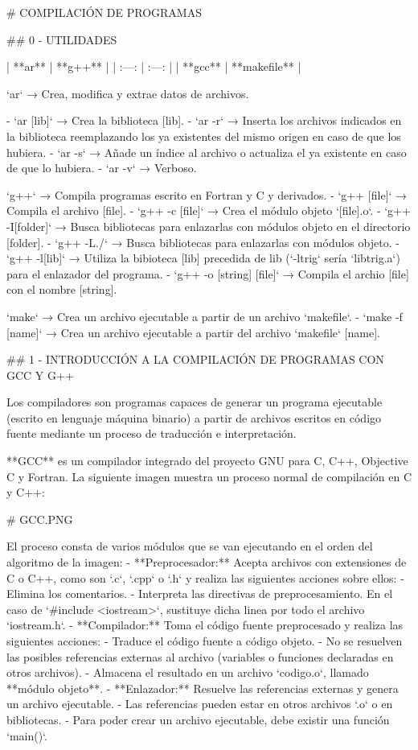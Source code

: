 # COMPILACIÓN DE PROGRAMAS

## 0 - UTILIDADES

| **ar** | **g++** |
| :---: | :---: |
| **gcc** | **makefile** |

`ar` → Crea, modifica y extrae datos de archivos.

- `ar [lib]` → Crea la biblioteca [lib].
- `ar -r` → Inserta los archivos indicados en la biblioteca reemplazando los ya existentes del mismo origen en caso de que los hubiera.
- `ar -s` → Añade un índice al archivo o actualiza el ya existente en caso de que lo hubiera.
- `ar -v` → Verboso.

`g++` → Compila programas escrito en Fortran y C y derivados.
- `g++ [file]` → Compila el archivo [file].
- `g++ -c [file]` → Crea el módulo objeto `[file].o`.
- `g++ -I[folder]` → Busca bibliotecas para enlazarlas con módulos objeto en el directorio [folder].
- `g++ -L./` → Busca bibliotecas para enlazarlas con módulos objeto.
- `g++ -l[lib]` → Utiliza la bibioteca [lib] precedida de lib (`-ltrig` sería `libtrig.a`) para el enlazador del programa.
- `g++ -o [string] [file]` → Compila el archio [file] con el nombre [string].

`make` → Crea un archivo ejecutable a partir de un archivo `makefile`.
- `make -f [name]` → Crea un archivo ejecutable a partir del archivo `makefile` [name].

## 1 - INTRODUCCIÓN A LA COMPILACIÓN DE PROGRAMAS CON GCC Y G++

Los compiladores son programas capaces de generar un programa ejecutable (escrito en lenguaje máquina binario) a partir de archivos escritos en código fuente mediante un proceso de traducción e interpretación.

**GCC** es un compilador integrado del proyecto GNU para C, C++, Objective C y Fortran. La siguiente imagen muestra un proceso normal de compilación en C y C++:

# GCC.PNG

El proceso consta de varios módulos que se van ejecutando en el orden del algoritmo de la imagen:
- **Preprocesador:** Acepta archivos con extensiones de C o C++, como son `.c`, `.cpp` o `.h` y realiza las siguientes acciones sobre ellos:
  - Elimina los comentarios.
  - Interpreta las directivas de preprocesamiento. En el caso de `#include <iostream>`, sustituye dicha linea por todo el archivo `iostream.h`.
- **Compilador:** Toma el código fuente preprocesado y realiza las siguientes acciones:
  - Traduce el código fuente a código objeto.
    - No se resuelven las posibles referencias externas al archivo (variables o funciones declaradas en otros archivos).
  - Almacena el resultado en un archivo `codigo.o`, llamado **módulo objeto**.
- **Enlazador:** Resuelve las referencias externas y genera un archivo ejecutable.
  - Las referencias pueden estar en otros archivos `.o` o en bibliotecas.
  - Para poder crear un archivo ejecutable, debe existir una función `main()`.

